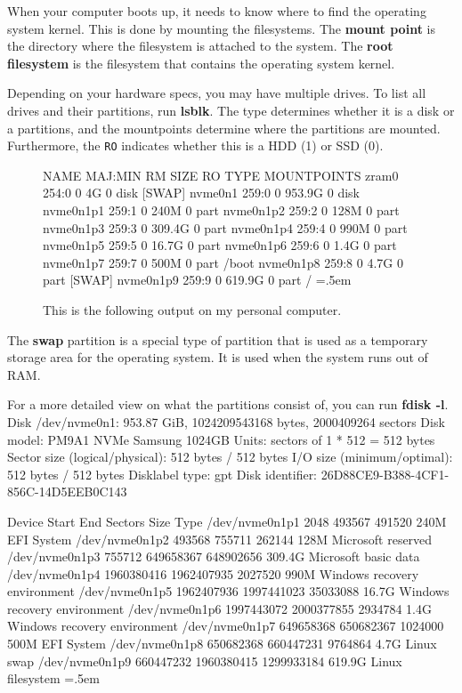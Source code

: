 \documentclass{article}
\theoremstyle{definition}
\newenvironment{cverbatim}
    {\SaveVerbatim{cverb}}
    {\endSaveVerbatim
    \flushleft\fboxrule=0pt\fboxsep=.5em
    \colorbox{cverbbg}{%
      \makebox[\dimexpr\linewidth-2\fboxsep][l]{\BUseVerbatim{cverb}}%
    }
    \endflushleft
  }
\begin{document}
  When your computer boots up, it needs to know where to find the operating system kernel. This is done by mounting the filesystems. The \textbf{mount point} is the directory where the filesystem is attached to the system. The \textbf{root filesystem} is the filesystem that contains the operating system kernel.

  Depending on your hardware specs, you may have multiple drives. To list all drives and their partitions, run \textbf{lsblk}. The type determines whether it is a disk or a partitions, and the mountpoints determine where the partitions are mounted. Furthermore, the \texttt{RO} indicates whether this is a HDD (1) or SSD (0). 

\begin{figure}[hbt!]
  \centering 
  \begin{cverbatim} 
  NAME        MAJ:MIN RM   SIZE RO TYPE MOUNTPOINTS
  zram0       254:0    0     4G  0 disk [SWAP]
  nvme0n1     259:0    0 953.9G  0 disk 
    nvme0n1p1 259:1    0   240M  0 part 
    nvme0n1p2 259:2    0   128M  0 part 
    nvme0n1p3 259:3    0 309.4G  0 part 
    nvme0n1p4 259:4    0   990M  0 part 
    nvme0n1p5 259:5    0  16.7G  0 part 
    nvme0n1p6 259:6    0   1.4G  0 part 
    nvme0n1p7 259:7    0   500M  0 part /boot
    nvme0n1p8 259:8    0   4.7G  0 part [SWAP]
    nvme0n1p9 259:9    0 619.9G  0 part /
  \end{cverbatim}
  \caption{This is the following output on my personal computer. } 
  \label{fig:lsblk}
\end{figure}
  
  The \textbf{swap} partition is a special type of partition that is used as a temporary storage area for the operating system. It is used when the system runs out of RAM. 

  For a more detailed view on what the partitions consist of, you can run \textbf{fdisk -l}.
  \begin{cverbatim} 
  Disk /dev/nvme0n1: 953.87 GiB, 1024209543168 bytes, 2000409264 sectors
  Disk model: PM9A1 NVMe Samsung 1024GB               
  Units: sectors of 1 * 512 = 512 bytes
  Sector size (logical/physical): 512 bytes / 512 bytes
  I/O size (minimum/optimal): 512 bytes / 512 bytes
  Disklabel type: gpt
  Disk identifier: 26D88CE9-B388-4CF1-856C-14D5EEB0C143

  Device              Start        End    Sectors   Size Type
  /dev/nvme0n1p1       2048     493567     491520   240M EFI System
  /dev/nvme0n1p2     493568     755711     262144   128M Microsoft reserved
  /dev/nvme0n1p3     755712  649658367  648902656 309.4G Microsoft basic data
  /dev/nvme0n1p4 1960380416 1962407935    2027520   990M Windows recovery environment
  /dev/nvme0n1p5 1962407936 1997441023   35033088  16.7G Windows recovery environment
  /dev/nvme0n1p6 1997443072 2000377855    2934784   1.4G Windows recovery environment
  /dev/nvme0n1p7  649658368  650682367    1024000   500M EFI System
  /dev/nvme0n1p8  650682368  660447231    9764864   4.7G Linux swap
  /dev/nvme0n1p9  660447232 1960380415 1299933184 619.9G Linux filesystem
  \end{cverbatim}
\end{document}
